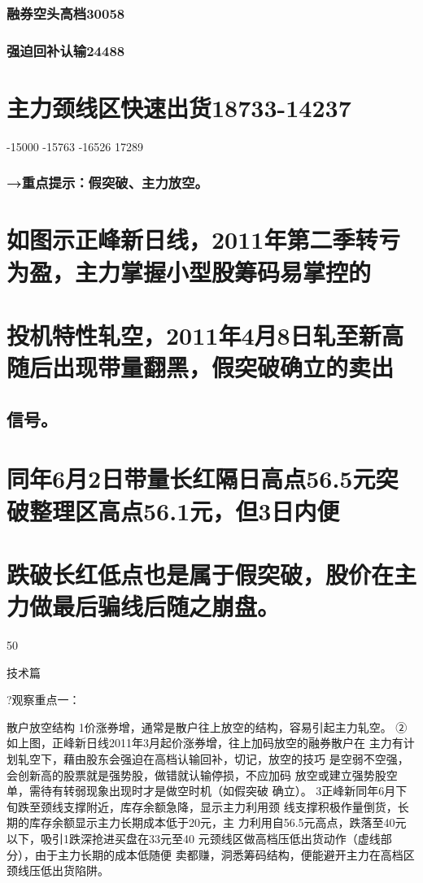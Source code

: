 \documentclass{article}
\begin{document}
\subsubsection{融券空头高档30058}

\subsubsection{强迫回补认输24488}

\section{主力颈线区快速出货18733-14237}

-15000 -15763 -16526 17289

\subsubsection{→重点提示：假突破、主力放空。}

\section{如图示正峰新日线，2011年第二季转亏为盈，主力掌握小型股筹码易掌控的}

\section{投机特性轧空，2011年4月8日轧至新高随后出现带量翻黑，假突破确立的卖出}

\subsection{信号。}

\section{同年6月2日带量长红隔日高点56.5元突破整理区高点56.1元，但3日内便}

\section{跌破长红低点也是属于假突破，股价在主力做最后骗线后随之崩盘。}

50

\clearpage

技术篇

?观察重点一：

散户放空结构 1价涨券增，通常是散户往上放空的结构，容易引起主力轧空。 ②如上图，正峰新日线2011年3月起价涨券增，往上加码放空的融券散户在 主力有计划轧空下，藉由股东会强迫在高档认输回补，切记，放空的技巧 是空弱不空强，会创新高的股票就是强势股，做错就认输停损，不应加码 放空或建立强势股空单，需待有转弱现象出现时才是做空时机（如假突破 确立）。 3正峰新同年6月下旬跌至颈线支撑附近，库存余额急降，显示主力利用颈 线支撑积极作量倒货，长期的库存余额显示主力长期成本低于20元，主 力利用自56.5元高点，跌落至40元以下，吸引1跌深抢进买盘在33元至40 元颈线区做高档压低出货动作（虚线部分），由于主力长期的成本低随便 卖都赚，洞悉筹码结构，便能避开主力在高档区颈线压低出货陷阱。
\end{document}
